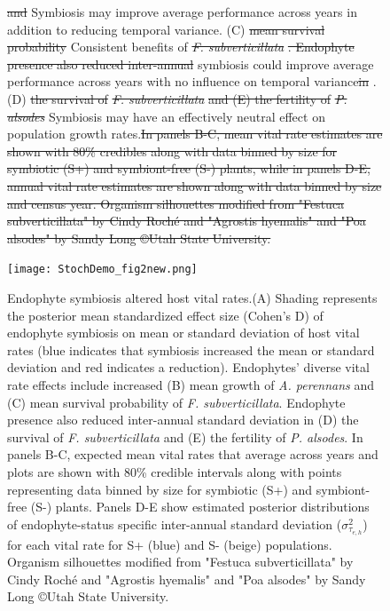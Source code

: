 \documentclass[lineno,sn-nature]{sn-jnl}%
\providecommand{\DIFadd}[1]{{\protect\color{blue}#1}} %
\providecommand{\DIFdel}[1]{{\protect\color{red}\protect\scriptsize\sout{#1}}}
\providecommand{\DIFadd}[1]{{\protect\color{blue}\uwave{#1}}} %
\providecommand{\DIFdel}[1]{{\protect\color{red}\sout{#1}}}                      %
\providecommand{\DIFaddbegin}{} %
\providecommand{\DIFaddFL}[1]{\DIFadd{#1}} %
\providecommand{\DIFdelFL}[1]{\DIFdel{#1}} %
\providecommand{\DIFaddbeginFL}{} %
\providecommand{\DIFaddendFL}{} %
\providecommand{\DIFdelbeginFL}{} %
\providecommand{\DIFdelendFL}{} %
\newcommand{\DIFscaledelfig}{0.5}
\newlength{\DIFdelgraphicswidth} %
\newlength{\DIFdelgraphicsheight} %
\newcommand{\DIFaddincludegraphics}[2][]{{\color{blue}\fbox{\DIFOincludegraphics[#1]{#2}}}} %
\newcommand{\DIFdelincludegraphics}[2][]{%
\sbox{\DIFdelgraphicsbox}{\DIFOincludegraphics[#1]{#2}}%
\settoboxwidth{\DIFdelgraphicswidth}{\DIFdelgraphicsbox} %
\settoboxtotalheight{\DIFdelgraphicsheight}{\DIFdelgraphicsbox} %
\scalebox{\DIFscaledelfig}{%
\parbox[b]{\DIFdelgraphicswidth}{\usebox{\DIFdelgraphicsbox}\\[-\baselineskip] \rule{\DIFdelgraphicswidth}{0em}}\llap{\resizebox{\DIFdelgraphicswidth}{\DIFdelgraphicsheight}{%
\setlength{\unitlength}{\DIFdelgraphicswidth}%
\begin{picture}(1,1)%
\thicklines\linethickness{2pt} %
{\color[rgb]{1,0,0}\put(0,0){\framebox(1,1){}}}%
{\color[rgb]{1,0,0}\put(0,0){\line( 1,1){1}}}%
{\color[rgb]{1,0,0}\put(0,1){\line(1,-1){1}}}%
\end{picture}%
}\hspace*{3pt}}} %
} %
\DeclareRobustCommand{\DIFaddbegin}{\DIFOaddbegin \let\includegraphics\DIFaddincludegraphics} %
\DeclareRobustCommand{\DIFaddbeginFL}{\DIFOaddbeginFL \let\includegraphics\DIFaddincludegraphics} %
\DeclareRobustCommand{\DIFaddendFL}{\DIFOaddendFL \let\includegraphics\DIFOincludegraphics} %
\DeclareRobustCommand{\DIFdelbeginFL}{\DIFOdelbeginFL \let\includegraphics\DIFdelincludegraphics} %
\DeclareRobustCommand{\DIFdelendFL}{\DIFOaddendFL \let\includegraphics\DIFOincludegraphics} %
\begin{document}
\begin{figure}[h]
{\DIFdelFL{and }\DIFdelendFL \DIFaddbeginFL \DIFaddFL{Symbiosis may improve average performance across years in addition to reducing temporal variance. }\DIFaddendFL (C) \DIFdelbeginFL \DIFdelFL{mean survival probability }\DIFdelendFL \DIFaddbeginFL \DIFaddFL{Consistent benefits }\DIFaddendFL of \DIFdelbeginFL \emph{\DIFdelFL{F. subverticillata}}%
\DIFdelFL{. Endophyte presence also reduced inter-annual }\DIFdelendFL \DIFaddbeginFL \DIFaddFL{symbiosis could improve average performance across years with no influence on temporal }\DIFaddendFL variance\DIFdelbeginFL \DIFdelFL{in }\DIFdelendFL \DIFaddbeginFL \DIFaddFL{. }\DIFaddendFL (D) \DIFdelbeginFL \DIFdelFL{the survival of }\emph{\DIFdelFL{F. subverticillata}} %
\DIFdelFL{and (E) the fertility of }\emph{\DIFdelFL{P. alsodes}}%
\DIFdelendFL \DIFaddbeginFL \DIFaddFL{Symbiosis may have an effectively neutral effect on population growth rates}\DIFaddendFL .\DIFdelbeginFL \DIFdelFL{In panels B-C, mean vital rate estimates are shown with 80\% credibles along with data binned by size for symbiotic (S+) and symbiont-free (S-) plants, while in panels D-E, annual vital rate estimates are shown along with data binned by size and census year. Organism silhouettes modified from "Festuca subverticillata" by Cindy Roch\'e and "Agrostis hyemalis" and "Poa alsodes" by Sandy Long \copyright Utah State University.}\DIFdelendFL }
\end{figure}

\DIFaddbegin \begin{figure}[h]
	\centering
	\texttt{[image: StochDemo\_fig2new.png]}
	\caption{\DIFaddFL{Endophyte symbiosis altered host vital rates.(A) Shading represents the posterior mean standardized effect size (Cohen's D) of endophyte symbiosis on mean or standard deviation of host vital rates (blue indicates that symbiosis increased the mean or standard deviation and red indicates a reduction). Endophytes' diverse vital rate effects include increased (B) mean growth of }\emph{\DIFaddFL{A. perennans}} \DIFaddFL{and (C) mean survival probability of }\emph{\DIFaddFL{F. subverticillata}}\DIFaddFL{. Endophyte presence also reduced inter-annual standard deviation in (D) the survival of }\emph{\DIFaddFL{F. subverticillata}} \DIFaddFL{and (E) the fertility of }\emph{\DIFaddFL{P. alsodes}}\DIFaddFL{. In panels B-C, expected mean vital rates that average across years and plots are shown with 80\% credible intervals along with points representing data binned by size for symbiotic (S+) and symbiont-free (S-) plants. Panels D-E show estimated posterior distributions of endophyte-status specific inter-annual standard deviation ($\sigma^2_{\tau_{e,h}}$)  for each vital rate for S+ (blue) and S- (beige) populations. Organism silhouettes modified from "Festuca subverticillata" by Cindy Roch\'e and "Agrostis hyemalis" and "Poa alsodes" by Sandy Long \copyright Utah State University.}}
\end{figure}
\end{document}
